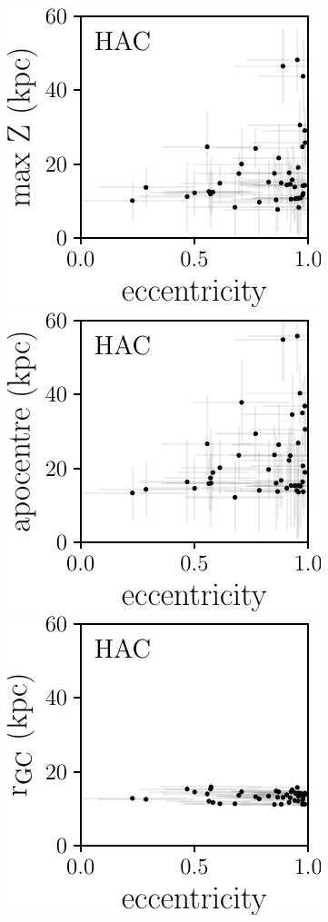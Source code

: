 \documentclass[fleqn,usenatbib]{mnras}
\begin{document}
\begin{figure}
	\includegraphics[scale=0.473]{HAC_orbits_ecc_z.pdf}
    \includegraphics[scale=0.473]{HAC_orbits_apo_ecc.pdf} 
  \includegraphics[scale=0.473]{HAC_orbits_ecc_r.pdf} 

\end{figure}
\end{document}
